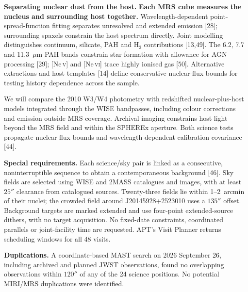 \documentclass[12pt]{article}
\begin{document}
\noindent\textbf{Separating nuclear dust from the host.}
\textbf{Each MRS cube measures the nucleus and surrounding host together.} Wavelength-dependent point-spread-function fitting separates unresolved and extended emission [28]; surrounding spaxels constrain the host spectrum directly. Joint modelling distinguishes continuum, silicate, PAH and H$_2$ contributions [13,49]. The 6.2, 7.7 and 11.3~$\mu$m PAH bands constrain star formation with allowance for AGN processing [29]; [Ne\,\textsc{v}] and [Ne\,\textsc{vi}] trace highly ionised gas [50]. Alternative extractions and host templates [14] define conservative nuclear-flux bounds for testing history dependence across the sample.

We will compare the 2010 W3/W4 photometry with redshifted nuclear-plus-host models integrated through the WISE bandpasses, including colour corrections and emission outside MRS coverage. Archival imaging constrains host light beyond the MRS field and within the SPHEREx aperture. Both science tests propagate nuclear-flux bounds and wavelength-dependent calibration covariance [44].

\clearpage
\supplementalinformation
\noindent\textbf{Special requirements.} Each science/sky pair is linked as a consecutive, noninterruptible sequence to obtain a contemporaneous background [46]. Sky fields are selected using WISE and 2MASS catalogues and images, with at least $25''$ clearance from catalogued sources. Twenty-three fields lie within 1--2~arcmin of their nuclei; the crowded field around J20145928+2523010 uses a $135''$ offset. Background targets are marked extended and use four-point extended-source dithers, with no target acquisition. No fixed-date constraints, coordinated parallels or joint-facility time are requested. APT's Visit Planner returns scheduling windows for all 48 visits.

\noindent\textbf{Duplications.} A coordinate-based MAST search on 2026 September 26, including archived and planned JWST observations, found no overlapping observations within $120''$ of any of the 24 science positions. No potential MIRI/MRS duplications were identified.
\end{document}
